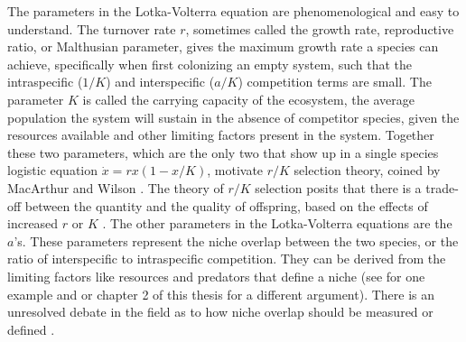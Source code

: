 The parameters in the Lotka-Volterra equation are phenomenological and easy to understand. 
The turnover rate $r$, sometimes called the growth rate, reproductive ratio, or Malthusian parameter, gives the maximum growth rate a species can achieve, specifically when first colonizing an empty system, such that the intraspecific ($1/K$) and interspecific ($a/K$) competition terms are small. 
The parameter $K$ is called the carrying capacity of the ecosystem, the average population the system will sustain in the absence of competitor species, given the resources available and other limiting factors present in the system. 
Together these two parameters, which are the only two that show up in a single species logistic equation $\dot{x}=rx(1-x/K)$, motivate $r/K$ selection theory, coined by MacArthur and Wilson \cite{MacArthur1967a}. 
The theory of $r/K$ selection posits that there is a trade-off between the quantity and the quality of offspring, based on the effects of increased $r$ or $K$ \cite{MacArthur1967a}. 
%
The other parameters in the Lotka-Volterra equations are the $a$'s. 
These parameters represent the niche overlap between the two species, or the ratio of interspecific to intraspecific competition. 
They can be derived from the limiting factors like resources and predators that define a niche (see \cite{MacArthur1967} for one example and \cite{MacArthur1970} or chapter 2 of this thesis for a different argument).  %
There is an unresolved debate in the field as to how niche overlap should be measured or defined \cite{Klopfer1961,Pianka1973,Pianka1974,Abrams1977,Hurlbert1978,Connell1980,Abrams1980,Schoener1985,Chesson1990,Leibold1995,Chesson2008}. %
